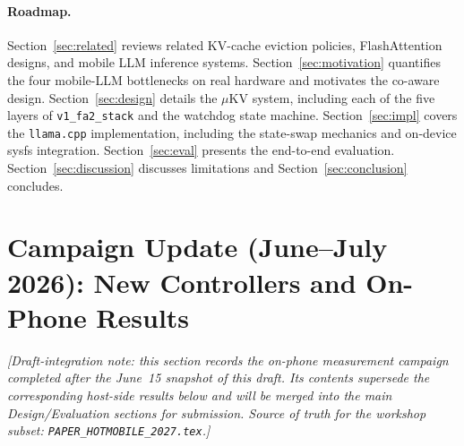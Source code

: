 \documentclass[sigconf, anonymous=false, screen=true]{acmart}
\begin{document}
\paragraph{Roadmap.}
Section~\ref{sec:related} reviews related KV-cache eviction policies, FlashAttention designs, and mobile LLM inference systems. Section~\ref{sec:motivation} quantifies the four mobile-LLM bottlenecks on real hardware and motivates the co-aware design. Section~\ref{sec:design} details the \textsc{$\mu$KV} system, including each of the five layers of \texttt{v1\_fa2\_stack} and the watchdog state machine. Section~\ref{sec:impl} covers the \texttt{llama.cpp} implementation, including the state-swap mechanics and on-device sysfs integration. Section~\ref{sec:eval} presents the end-to-end evaluation. Section~\ref{sec:discussion} discusses limitations and Section~\ref{sec:conclusion} concludes.

\section{Campaign Update (June--July 2026): New Controllers and On-Phone Results}
\label{sec:campaign}

\emph{[Draft-integration note: this section records the on-phone measurement campaign completed after the June~15 snapshot of this draft. Its contents supersede the corresponding host-side results below and will be merged into the main Design/Evaluation sections for submission. Source of truth for the workshop subset: \texttt{PAPER\_HOTMOBILE\_2027.tex}.]}
\end{document}
